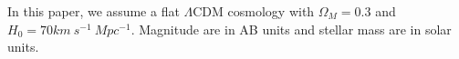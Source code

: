 \documentclass[fleqn,usenatbib]{mnras}
\begin{document}
\par In this paper, we assume a flat $\Lambda$CDM cosmology with $\Omega_M = 0.3$ and $H_0 = 70 km ~s^{-1}~Mpc^{-1}$. Magnitude are in AB units and stellar mass are in solar units.
\end{document}
